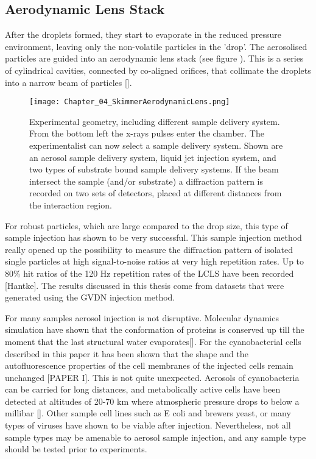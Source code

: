\subsection{Aerodynamic Lens Stack}
After the droplets formed, they start to evaporate in the reduced pressure environment, leaving only the non-volatile particles in the 'drop'. The aerosolised particles are guided into an aerodynamic lens stack (see figure ). This is a series of cylindrical cavities, connected by co-aligned orifices, that collimate the droplets into a narrow beam of particles [].

\begin{figure}[h]\label{fig:skimmer_aerolens}
\centering 
\texttt{[image: Chapter\_04\_SkimmerAerodynamicLens.png]}
\caption{Experimental geometry, including different sample delivery system. From the bottom left the x-rays pulses enter the chamber. The experimentalist can now select a sample delivery system. Shown are an aerosol sample delivery system, liquid jet injection system, and two types of substrate bound sample delivery systems. If the beam intersect the sample (and/or substrate) a diffraction pattern is recorded on two sets of detectors, placed at different distances from the interaction region.}
\end{figure}

For robust particles, which are large compared to the drop size, this type of sample injection has shown to be very successful. This sample injection method really opened up the possibility to measure the diffraction pattern of isolated single particles at high signal-to-noise ratios at very high repetition rates. Up to 80\% hit ratios of the 120 Hz repetition rates of the LCLS have been recorded [Hantke]. The results discussed in this thesis come from datasets that were generated using the GVDN injection method.

For many samples aerosol injection is not disruptive. Molecular dynamics simulation have shown that the conformation of proteins is conserved up till the moment that the last structural water evaporates[]. For the cyanobacterial cells described in this paper it has been shown that the shape and the autofluorescence properties of the cell membranes of the injected cells remain unchanged [PAPER I]. This is not quite unexpected. Aerosols of cyanobacteria can be carried for long distances, and metabolically active cells have been detected at altitudes of 20-70 km where atmospheric pressure drops to below a millibar []. Other sample cell lines such as E coli and brewers yeast, or many types of viruses have shown to be viable after injection. Nevertheless, not all sample types may be amenable to aerosol sample injection, and any sample type should be tested prior to experiments.  

